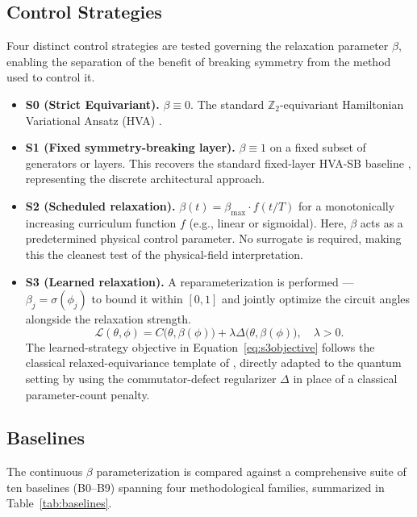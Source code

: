 \documentclass[pdflatex,sn-mathphys-num]{sn-jnl}
\theoremstyle{thmstyleone}
\theoremstyle{thmstyletwo}
\theoremstyle{thmstylethree}
\begin{document}
\subsection{Control Strategies}

Four distinct control strategies are tested governing the relaxation parameter $\beta$, enabling the separation of the benefit of breaking symmetry from the method used to control it.
\begin{itemize}
    \item \textbf{S0 (Strict Equivariant).} $\beta \equiv 0$. The standard $\mathbb{Z}_2$-equivariant Hamiltonian Variational Ansatz (HVA) \cite{nguyen2024theory}.
    \item \textbf{S1 (Fixed symmetry-breaking layer).} $\beta \equiv 1$ on a fixed subset of generators or layers. This recovers the standard fixed-layer HVA-SB baseline \cite{park2021symmetry,park2024symmetry}, representing the discrete architectural approach.
    \item \textbf{S2 (Scheduled relaxation).} $\beta(t) = \beta_{\text{max}} \cdot f(t/T)$ for a monotonically increasing curriculum function $f$ (e.g., linear or sigmoidal). Here, $\beta$ acts as a predetermined physical control parameter. No surrogate is required, making this the cleanest test of the physical-field interpretation.
    \item \textbf{S3 (Learned relaxation).} A reparameterization is performed --- $\beta_j = \sigma(\phi_j)$ to bound it within $[0,1]$ and jointly optimize the circuit angles alongside the relaxation strength.
    \begin{equation}
    \mathcal{L}(\theta, \phi) = C\big(\theta, \beta(\phi)\big) + \lambda \Delta\big(\theta, \beta(\phi)\big), \quad \lambda > 0.
    \label{eq:s3objective}
    \end{equation}
    The learned-strategy objective in Equation~\eqref{eq:s3objective} follows the classical relaxed-equivariance template of \cite{vanderouderaa2022relaxed}, directly adapted to the quantum setting by using the commutator-defect regularizer $\Delta$ in place of a classical parameter-count penalty.
\end{itemize}

\subsection{Baselines}

The continuous $\beta$ parameterization is compared against a comprehensive suite of ten baselines (B0--B9) spanning four methodological families, summarized in Table~\ref{tab:baselines}.
\end{document}
